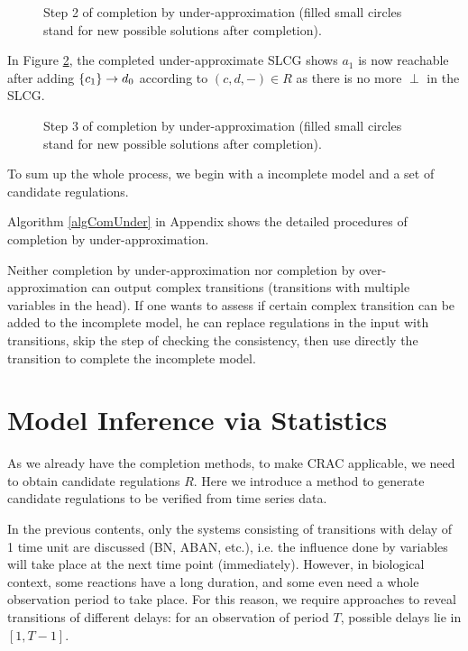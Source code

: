 \begin{example}
\begin{figure}[ht]
\centering

\caption[Operations on SLCG(2)]{Step 2 of completion by under-approximation (filled small circles stand for new possible solutions after completion).}\label{Under2}
\end{figure}

In Figure \ref{Under3}, the completed under-approximate SLCG shows $a_1$ is now reachable after adding $\acm{c_1}{d_1}{d_0}$ according to ${(c,d,-)}\in R$ as there is no more $\perp$ in the SLCG.

\begin{figure}[ht]
\centering

\caption[Operations on SLCG(3)]{Step 3 of completion by under-approximation (filled small circles stand for new possible solutions after completion).}\label{Under3}
\end{figure}
\end{example}

To sum up the whole process, we begin with a incomplete model and a set of candidate regulations.


Algorithm \ref{algComUnder} in Appendix shows the detailed procedures of completion by under-approximation.

\begin{remark}
Neither completion by under-approximation nor completion by over-approximation can output complex transitions (transitions with multiple variables in the head).
If one wants to assess if certain complex transition can be added to the incomplete model, he can replace regulations in the input with transitions, skip the step of checking the consistency, then use directly the transition to complete the incomplete model.
\end{remark}

\section{Model Inference via Statistics}
As we already have the completion methods, to make CRAC applicable, we need to obtain candidate regulations $R$.
Here we introduce a method to generate candidate regulations to be verified from time series data.

In the previous contents, only the systems consisting of transitions with delay of 1 time unit are discussed (BN, ABAN, etc.), i.e. the influence done by variables will take place at the next time point (immediately).
However, in biological context, some reactions have a long duration, and some even need a whole observation period to take place.
For this reason, we require approaches to reveal transitions of different delays: for an observation of period $T$, possible delays lie in $[1,T-1]$.

